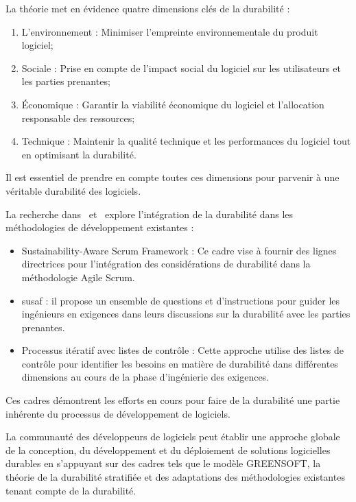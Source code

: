 La théorie met en évidence quatre dimensions clés de la durabilité :
\begin{enumerate}
    \item L'environnement : Minimiser l'empreinte environnementale du produit logiciel;
    \item Sociale : Prise en compte de l'impact social du logiciel sur les utilisateurs et les parties prenantes;
    \item Économique : Garantir la viabilité économique du logiciel et l'allocation responsable des ressources;
    \item Technique : Maintenir la qualité technique et les performances du logiciel tout en optimisant la durabilité.
\end{enumerate}
Il est essentiel de prendre en compte toutes ces dimensions pour parvenir à une véritable durabilité des logiciels.


La recherche dans~\cite{SustainabilityAwarenessFramework} et~\cite{SustainabilityRequirementsEngineering} explore l'intégration de la durabilité dans les méthodologies de développement existantes :
\begin{itemize}
    \item Sustainability-Aware Scrum Framework : Ce cadre vise à fournir des lignes directrices pour l'intégration des considérations de durabilité dans la méthodologie Agile Scrum.
    \item \acrfull{susaf} : il propose un ensemble de questions et d'instructions pour guider les ingénieurs en exigences dans leurs discussions sur la durabilité avec les parties prenantes.
    \item Processus itératif avec listes de contrôle : Cette approche utilise des listes de contrôle pour identifier les besoins en matière de durabilité dans différentes dimensions au cours de la phase d'ingénierie des exigences.
\end{itemize}
Ces cadres démontrent les efforts en cours pour faire de la durabilité une partie inhérente du processus de développement de logiciels.


La communauté des développeurs de logiciels peut établir une approche globale de la conception, du développement et du déploiement de solutions logicielles durables en s'appuyant sur des cadres tels que le modèle GREENSOFT, la théorie de la durabilité stratifiée et des adaptations des méthodologies existantes tenant compte de la durabilité.

